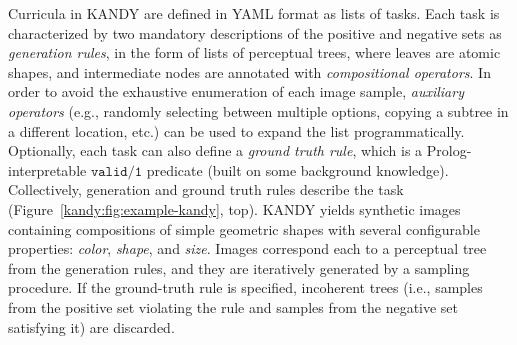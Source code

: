 Curricula in \textsc{KANDY} are defined in YAML format as lists of tasks. Each task is characterized by two mandatory descriptions of the positive and negative sets as {\it generation rules}, in the form of lists of perceptual trees, where leaves are atomic shapes, and intermediate nodes are annotated with {\it compositional operators}.  In order to avoid the exhaustive enumeration of each image sample, {\it auxiliary operators} (e.g., randomly selecting between multiple options, copying a subtree in a different location, etc.) can be used to expand the list programmatically.
Optionally, each task can also define a {\it ground truth rule}, which is a Prolog-interpretable $\texttt{valid/1}$ predicate (built on some background knowledge). Collectively, generation and ground truth rules describe the task (Figure~\ref{kandy:fig:example-kandy}, top).
KANDY yields synthetic images containing compositions of simple geometric shapes with several configurable properties: \textit{color}, \textit{shape}, and \textit{size}. %
%
Images correspond each to a perceptual tree from the generation rules, and they are iteratively generated by a sampling procedure. If the ground-truth rule is specified, incoherent trees (i.e., samples from the positive set violating the rule and samples from the negative set satisfying it) are discarded.



